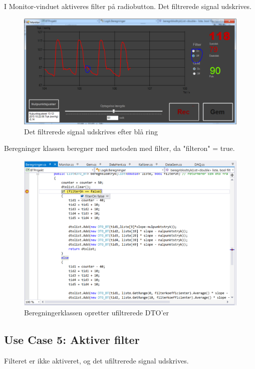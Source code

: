 I Monitor-vinduet aktiveres filter på radiobutton. Det filtrerede signal udskrives. 

\begin{figure}[H]
	\centering
	\includegraphics[width=1\textwidth]{Figurer/Test_Deaktiver_3}
	\caption{Det filtrerede signal udskrives efter blå ring}
\end{figure}

Beregninger klassen beregner med metoden med filter, da "filteron" = true.

\begin{figure}[H]
	\centering
	\includegraphics[width=1\textwidth]{Figurer/Test_Deaktiver_4}
	\caption{Beregningerklassen opretter ufiltrerede DTO'er}
\end{figure}

\subsection{Use Case 5: Aktiver filter}

Filteret er ikke aktiveret, og det ufiltrerede signal udskrives.


